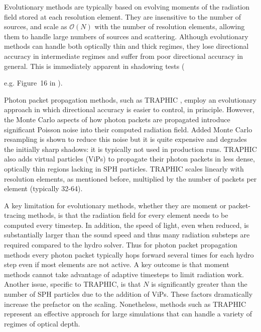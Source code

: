 \documentclass[fleq,usenatbib]{mnras}
\begin{document}
Evolutionary methods are typically based on evolving moments of the radiation 
field stored at each resolution element. They are insensitive to the number of 
sources, and scale as $\mathcal{O}(N)$ with the number of resolution elements, 
allowing them to handle large numbers of sources and scattering. Although 
evolutionary methods can handle both optically thin and thick regimes, they 
lose directional accuracy in intermediate regimes and suffer from poor 
directional accuracy in general. This is immediately apparent in shadowing 
tests ({e.g. Figure~16 in \citealt{rosdahlEt13}).

Photon packet propagation methods, such as TRAPHIC \citep{pawlikSchaye08}, 
employ an evolutionary approach in which directional accuracy is easier to 
control, in principle. However, the Monte Carlo aspects of how photon packets 
are propagated introduce significant Poisson noise into their computed 
radiation field. Added Monte Carlo resampling is shown to reduce this noise 
but it is quite expensive and degrades the initially sharp shadows: it is 
typically not used in production runs. TRAPHIC also adds virtual particles 
(ViPs) to propagate their photon packets in less dense, optically thin regions 
lacking in SPH particles. TRAPHIC scales linearly with resolution elements, as 
mentioned before, multiplied by the number of packets per element (typically 32-64).

A key limitation for evolutionary methods, whether they are moment or packet-tracing methods,
is that the radiation field for every 
element needs to be computed every timestep. In addition, the speed of light, 
even when reduced, is substantially larger than the sound speed and thus many 
radiation substeps are required compared to the hydro solver. Thus for photon 
packet propagation methods every photon packet typically hops forward several 
times for each hydro step even if most elements are not active.
A key outcome is that moment methods cannot take
advantage of adaptive timesteps to limit radiation work.  Another issue, specific
to TRAPHIC, is that $N$ is significantly greater than the number of SPH 
particles due to the addition of ViPs. These factors dramatically increase 
the prefactor on the scaling.  Nonetheless, methods such as TRAPHIC 
represent an effective approach for large simulations that can handle a variety 
of regimes of optical depth.

}
\end{document}
